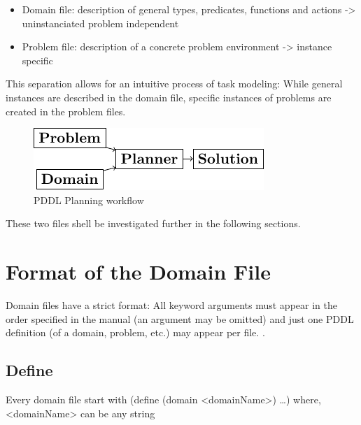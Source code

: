 \documentclass[11pt]{report}
\begin{document}
\begin{itemize}
\item Domain file: description of general types, predicates, functions
and actions -> uninstanciated problem independent
\item Problem file: description of a concrete problem environment -> instance speciﬁc
\end{itemize}

This separation allows for an intuitive process of task modeling:
While general instances are described in the domain file, specific
instances of problems are created in the problem files.

\begin{figure}[htb]
\centering
\includegraphics[width=.9\linewidth]{../img/pddl-workflow.pdf}
\caption{\label{fig:workflow}PDDL Planning workflow}
\end{figure}

These two files shell be investigated further in the following
sections.

\section{Format of the Domain File}
\label{sec-3-1}
Domain files have a strict format: All keyword arguments must appear
in the order specified in the manual (an argument may be omitted) and
just one PDDL definition (of a domain, problem, etc.) may appear per
file. \cite[6]{fox2003pddl2}.

\begin{center}
\end{center}

\subsection{Define}
\label{sec-3-1-1}
Every domain file start with (define (domain <domainName>) \ldots{}) where,
<domainName> can be any string
\end{document}
